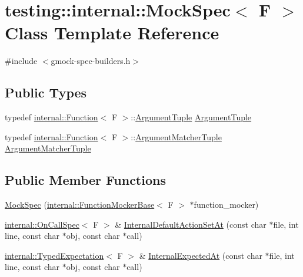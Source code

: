 \hypertarget{classtesting_1_1internal_1_1MockSpec}{}\section{testing\+:\+:internal\+:\+:Mock\+Spec$<$ F $>$ Class Template Reference}
\label{classtesting_1_1internal_1_1MockSpec}


{\ttfamily \#include $<$gmock-\/spec-\/builders.\+h$>$}

\subsection*{Public Types}
\begin{DoxyCompactItemize}
\item 
typedef \hyperlink{structtesting_1_1internal_1_1Function}{internal\+::\+Function}$<$ F $>$\+::\hyperlink{classtesting_1_1internal_1_1MockSpec_a7d520daca5d4d937578b4c7e8f0cf43e}{Argument\+Tuple} \hyperlink{classtesting_1_1internal_1_1MockSpec_a7d520daca5d4d937578b4c7e8f0cf43e}{Argument\+Tuple}
\item 
typedef \hyperlink{structtesting_1_1internal_1_1Function}{internal\+::\+Function}$<$ F $>$\+::\hyperlink{classtesting_1_1internal_1_1MockSpec_a35dc5836483cb8c6882c365c447b26cd}{Argument\+Matcher\+Tuple} \hyperlink{classtesting_1_1internal_1_1MockSpec_a35dc5836483cb8c6882c365c447b26cd}{Argument\+Matcher\+Tuple}
\end{DoxyCompactItemize}
\subsection*{Public Member Functions}
\begin{DoxyCompactItemize}
\item 
\hyperlink{classtesting_1_1internal_1_1MockSpec_a067fe3d12433cec0aa63f396f4f55fa9}{Mock\+Spec} (\hyperlink{classtesting_1_1internal_1_1FunctionMockerBase}{internal\+::\+Function\+Mocker\+Base}$<$ F $>$ $\ast$function\+\_\+mocker)
\item 
\hyperlink{classtesting_1_1internal_1_1OnCallSpec}{internal\+::\+On\+Call\+Spec}$<$ F $>$ \& \hyperlink{classtesting_1_1internal_1_1MockSpec_a875c99443da1265604d87429693457f4}{Internal\+Default\+Action\+Set\+At} (const char $\ast$file, int line, const char $\ast$obj, const char $\ast$call)
\item 
\hyperlink{classtesting_1_1internal_1_1TypedExpectation}{internal\+::\+Typed\+Expectation}$<$ F $>$ \& \hyperlink{classtesting_1_1internal_1_1MockSpec_a503a434637634014b9bb6c5d68fd336c}{Internal\+Expected\+At} (const char $\ast$file, int line, const char $\ast$obj, const char $\ast$call)
\end{DoxyCompactItemize}
